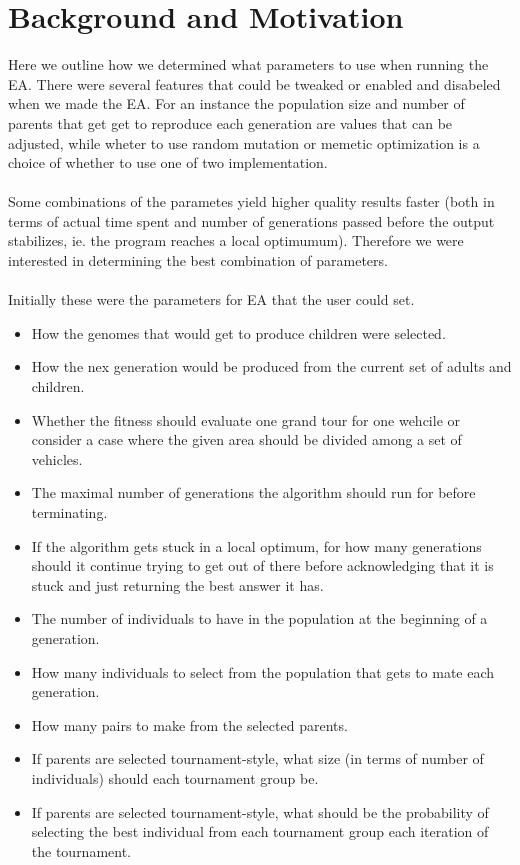 \section{Background and Motivation} %
\label{sec:background_and_motivation}
Here we outline how we determined what parameters to use when running the EA. There were several features that could be tweaked or enabled and disabeled when we made the EA. For an instance the population size and number of parents that get get to reproduce each generation are values that can be adjusted, while wheter to use random mutation or memetic optimization is a choice of whether to use one of two implementation.
\\\\
Some combinations of the parametes yield higher quality results faster (both in terms of actual time spent and number of generations passed before the output stabilizes, ie. the program reaches a local optimumum). Therefore we were interested in determining the best combination of parameters.
\\\\
Initially these were the parameters for EA that the user could set.
\begin{itemize}
	\item How the genomes that would get to produce children were selected.
	\item How the nex generation would be produced from the current set of adults and children.
	\item Whether the fitness should evaluate one grand tour for one wehcile or consider a case where the given area should be divided among a set of vehicles.
	\item The maximal number of generations the algorithm should run for before terminating.
	\item If the algorithm gets stuck in a local optimum, for how many generations should it continue trying to get out of there before acknowledging that it is stuck and just returning the best answer it has.
	\item The number of individuals to have in the population at the beginning of a generation.
	\item How many individuals to select from the population that gets to mate each generation.
	\item How many pairs to make from the selected parents.
	\item If parents are selected tournament-style, what size (in terms of number of individuals) should each tournament group be.
	\item If parents are selected tournament-style, what should be the probability of selecting the best individual from each tournament group each iteration of the tournament.

\end{itemize}

